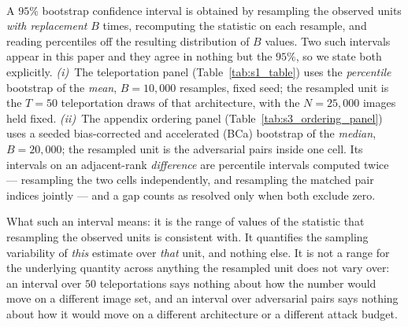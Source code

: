 \paragraph{}
\begin{clarifybox}
A $95\%$ bootstrap confidence interval is obtained by resampling the observed
units \emph{with replacement} $B$ times, recomputing the statistic on each
resample, and reading percentiles off the resulting distribution of $B$ values.
Two such intervals appear in this paper and they agree in nothing but the
$95\%$, so we state both explicitly. \emph{(i)}~The teleportation panel
(Table~\ref{tab:s1_table}) uses the \emph{percentile} bootstrap of the
\emph{mean}, $B=10{,}000$ resamples, fixed seed; the resampled unit is the
$T=50$ teleportation draws of that architecture, with the $N=25{,}000$ images
held fixed. \emph{(ii)}~The appendix ordering panel
(Table~\ref{tab:s3_ordering_panel}) uses a seeded bias-corrected and
accelerated (BCa) bootstrap of the \emph{median}, $B=20{,}000$; the resampled
unit is the adversarial pairs inside one cell. Its intervals on an
adjacent-rank \emph{difference} are percentile intervals computed twice ---
resampling the two cells independently, and resampling the matched pair indices
jointly --- and a gap counts as resolved only when both exclude zero.

What such an interval means: it is the range of values of the statistic that
resampling the observed units is consistent with. It quantifies the sampling
variability of \emph{this} estimate over \emph{that} unit, and nothing else. It
is not a range for the underlying quantity across anything the resampled unit
does not vary over: an interval over $50$ teleportations says nothing about how
the number would move on a different image set, and an interval over
adversarial pairs says nothing about how it would move on a different
architecture or a different attack budget.
\end{clarifybox}

